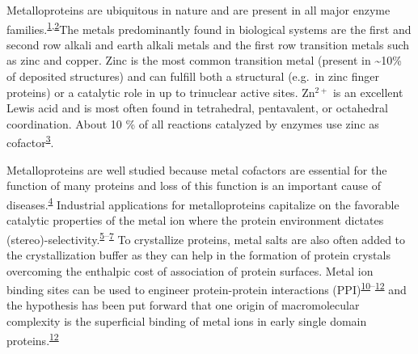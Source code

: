 \documentclass[ lineno,
  9pt]{elife}
\begin{document}
Metalloproteins are ubiquitous in nature and are present in all major enzyme families.\textsuperscript{\protect\hyperlink{ref-gxiv5uTU}{1},\protect\hyperlink{ref-LY9UGI7}{2}}The metals predominantly found in biological systems are the first and second row alkali and earth alkali metals and the first row transition metals such as zinc and copper. Zinc is the most common transition metal (present in \textasciitilde10\% of deposited structures) and can fulfill both a structural (e.g.~in zinc finger proteins) or a catalytic role in up to trinuclear active sites. Zn$^{2+}$ is an excellent Lewis acid and is most often found in tetrahedral, pentavalent, or octahedral coordination. About 10 \% of all reactions catalyzed by enzymes use zinc as cofactor\textsuperscript{\protect\hyperlink{ref-iqbHG3rv}{3}}.

Metalloproteins are well studied because metal cofactors are essential for the function of many proteins and loss of this function is an important cause of diseases.\textsuperscript{\protect\hyperlink{ref-4sXp2sDw}{4}} Industrial applications for metalloproteins capitalize on the favorable catalytic properties of the metal ion where the protein environment dictates (stereo)-selectivity.\textsuperscript{\protect\hyperlink{ref-oOm5j05D}{5}--\protect\hyperlink{ref-13w4SiWCx}{7}} To crystallize proteins, metal salts are also often added to the crystallization buffer as they can help in the formation of protein crystals overcoming the enthalpic cost of association of protein surfaces. Metal ion binding sites can be used to engineer protein-protein interactions (PPI)\textsuperscript{\protect\hyperlink{ref-ROLANnJl}{10}--\protect\hyperlink{ref-17JMFzNJo}{12}} and the hypothesis has been put forward that one origin of macromolecular complexity is the superficial binding of metal ions in early single domain proteins.\textsuperscript{\protect\hyperlink{ref-17JMFzNJo}{12}}
\end{document}

